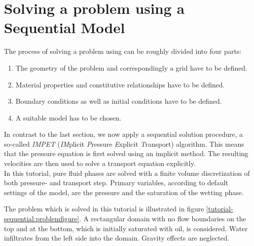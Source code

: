 \section[Sequential model]{Solving a problem using a Sequential Model}\label{tutorial-sequential}
The process of solving a problem using \Dumux can be roughly divided into four parts:
\begin{enumerate}
 \item The geometry of the problem and correspondingly a grid have to be defined.
 \item Material properties and constitutive relationships have to be defined.
 \item Boundary conditions as well as initial conditions have to be defined.
 \item A suitable model has to be chosen.
\end{enumerate}

In contrast to the last section, we now apply a sequential solution procedure, a
so-called \textit{IMPET} (\textit{IM}plicit \textit{P}ressure \textit{E}xplicit
\textit{T}ransport) algorithm. This means that the pressure equation is first
solved using an implicit method. The resulting velocities are then used to solve
a transport equation explicitly.\\
In this tutorial, pure fluid phases are solved with a finite volume discretization
of both pressure- and transport step. Primary variables, according to default
settings of the model, are the pressure and the saturation of the wetting phase.

The problem which is solved in this tutorial is illustrated in figure
\ref{tutorial-sequential:problemfigure}. A rectangular domain with no flow
boundaries on the top and at the bottom, which is initially saturated with oil,
is considered. Water infiltrates from the left side into the domain. Gravity
effects are neglected.


